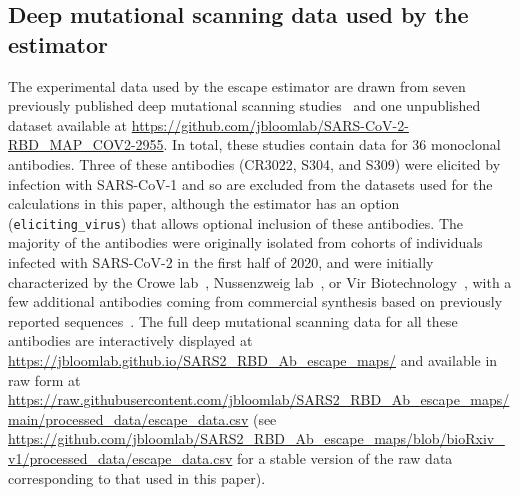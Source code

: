 \documentclass[9pt,twocolumn,twoside]{gsajnl_modified}
\begin{document}
{\subsection{Deep mutational scanning data used by the estimator}
The experimental data used by the escape estimator are drawn from seven previously published deep mutational scanning studies~\citep{greaney2021complete,greaney2021mapping,starr2021prospective,starr2021complete,starr2021sars,dong2021genetic,tortorici2021broad} and one unpublished dataset available at \url{https://github.com/jbloomlab/SARS-CoV-2-RBD_MAP_COV2-2955}.
In total, these studies contain data for 36 monoclonal antibodies.
Three of these antibodies (CR3022, S304, and S309) were elicited by infection with SARS-CoV-1 and so are excluded from the datasets used for the calculations in this paper, although the estimator has an option (\texttt{eliciting\_virus}) that allows optional inclusion of these antibodies.
The majority of the antibodies were originally isolated from cohorts of individuals infected with SARS-CoV-2 in the first half of 2020, and were initially characterized by the Crowe lab~\citep{zost2020potently}, Nussenzweig lab~\citep{robbiani2020convergent}, or Vir Biotechnology~\citep{piccoli2020mapping}, with a few additional antibodies coming from commercial synthesis based on previously reported sequences~\citep{hansen2020studies,jones2021neutralizing,shi2020human}.
The full deep mutational scanning data for all these antibodies are interactively displayed at \url{https://jbloomlab.github.io/SARS2_RBD_Ab_escape_maps/} and available in raw form at \url{https://raw.githubusercontent.com/jbloomlab/SARS2_RBD_Ab_escape_maps/main/processed_data/escape_data.csv} (see \url{https://github.com/jbloomlab/SARS2_RBD_Ab_escape_maps/blob/bioRxiv_v1/processed_data/escape_data.csv} for a stable version of the raw data corresponding to that used in this paper).

}
\end{document}

